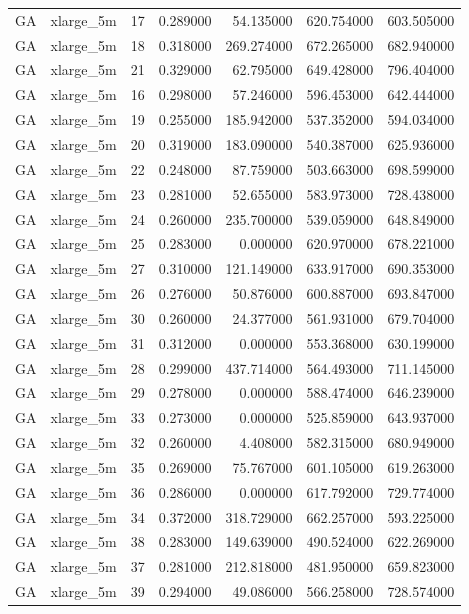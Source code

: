 \begin{tabular}{llrrrrr}
GA & xlarge_5m & 17 & 0.289000 & 54.135000 & 620.754000 & 603.505000 \\
GA & xlarge_5m & 18 & 0.318000 & 269.274000 & 672.265000 & 682.940000 \\
GA & xlarge_5m & 21 & 0.329000 & 62.795000 & 649.428000 & 796.404000 \\
GA & xlarge_5m & 16 & 0.298000 & 57.246000 & 596.453000 & 642.444000 \\
GA & xlarge_5m & 19 & 0.255000 & 185.942000 & 537.352000 & 594.034000 \\
GA & xlarge_5m & 20 & 0.319000 & 183.090000 & 540.387000 & 625.936000 \\
GA & xlarge_5m & 22 & 0.248000 & 87.759000 & 503.663000 & 698.599000 \\
GA & xlarge_5m & 23 & 0.281000 & 52.655000 & 583.973000 & 728.438000 \\
GA & xlarge_5m & 24 & 0.260000 & 235.700000 & 539.059000 & 648.849000 \\
GA & xlarge_5m & 25 & 0.283000 & 0.000000 & 620.970000 & 678.221000 \\
GA & xlarge_5m & 27 & 0.310000 & 121.149000 & 633.917000 & 690.353000 \\
GA & xlarge_5m & 26 & 0.276000 & 50.876000 & 600.887000 & 693.847000 \\
GA & xlarge_5m & 30 & 0.260000 & 24.377000 & 561.931000 & 679.704000 \\
GA & xlarge_5m & 31 & 0.312000 & 0.000000 & 553.368000 & 630.199000 \\
GA & xlarge_5m & 28 & 0.299000 & 437.714000 & 564.493000 & 711.145000 \\
GA & xlarge_5m & 29 & 0.278000 & 0.000000 & 588.474000 & 646.239000 \\
GA & xlarge_5m & 33 & 0.273000 & 0.000000 & 525.859000 & 643.937000 \\
GA & xlarge_5m & 32 & 0.260000 & 4.408000 & 582.315000 & 680.949000 \\
GA & xlarge_5m & 35 & 0.269000 & 75.767000 & 601.105000 & 619.263000 \\
GA & xlarge_5m & 36 & 0.286000 & 0.000000 & 617.792000 & 729.774000 \\
GA & xlarge_5m & 34 & 0.372000 & 318.729000 & 662.257000 & 593.225000 \\
GA & xlarge_5m & 38 & 0.283000 & 149.639000 & 490.524000 & 622.269000 \\
GA & xlarge_5m & 37 & 0.281000 & 212.818000 & 481.950000 & 659.823000 \\
GA & xlarge_5m & 39 & 0.294000 & 49.086000 & 566.258000 & 728.574000 \\

\end{tabular}
